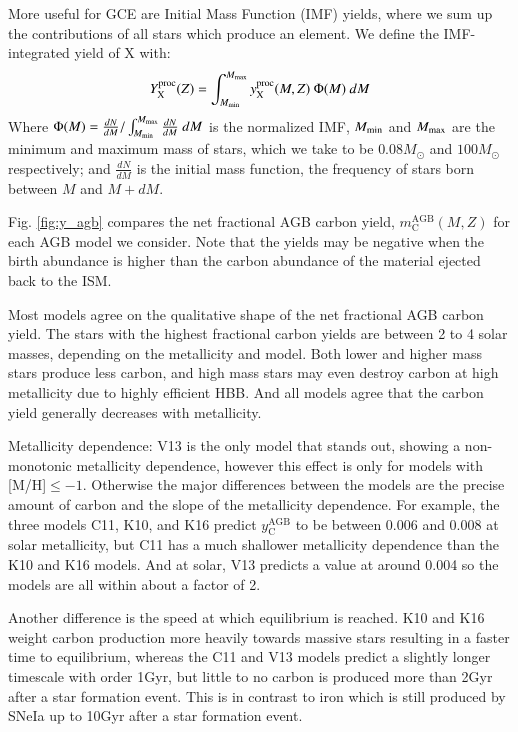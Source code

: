 \documentclass[12pt,oneside]{report}
\newcommand{\sun}{\ensuremath{\odot}}
\begin{document}
More useful for GCE are Initial Mass Function (IMF) yields, where we sum up the
contributions of all stars which produce an element.
We define the IMF-integrated yield of X with: 
\begin{equation}
Y_{\rm X}^{\rm proc}(Z) = \int_{M_{\rm min}}^{M_{\rm max}} y_{\rm X}^{\rm proc}(M, Z)\ \Phi(M)  \ dM
\end{equation}
Where $\Phi(M) = \frac{dN}{dM}/ \int_{M_{\rm min}}^{M_{\rm max}} \frac{dN}{dM}\ dM$ is the normalized IMF, $M_{\rm min}$ and $M_{\rm max}$ are the minimum and maximum mass of stars, which we take to be $0.08 M_{\sun}$ and $100 M_{\sun}$ respectively; and $\frac{dN}{dM}$ is the initial mass function, the frequency of stars born between $M$ and $M+dM$.


Fig. \ref{fig:y_agb} compares the net fractional AGB carbon yield, $m_\text{C}^\text{AGB}(M, Z)$ for each AGB model we consider. Note that the yields may be negative when the birth abundance is higher than the carbon abundance of the material ejected back to the ISM. 

Most models agree on the qualitative shape of the net fractional AGB carbon yield. The stars with the highest fractional carbon yields are between 2 to 4 solar masses, depending on the metallicity and model. Both lower and higher mass stars produce less carbon, and high mass stars may even destroy carbon at high metallicity due to highly efficient HBB. And all models agree that the carbon yield generally decreases with metallicity. 


Metallicity dependence:
V13 is the only model that stands out, showing a non-monotonic metallicity dependence, however this effect is only for models with [M/H]$\leq -1$. Otherwise the major differences between the models are the precise amount of carbon and the slope of the metallicity dependence. For example, the three models C11, K10, and K16 predict $y_\text{C}^\text{AGB}$ to be between 0.006 and 0.008 at solar metallicity, but C11 has a much shallower metallicity dependence than the K10 and K16 models. And at solar, V13 predicts a value at around 0.004 so the models are all within about a factor of 2. 

Another difference is the speed at which equilibrium is reached. K10 and K16 weight carbon production more heavily towards massive stars resulting in a faster time to equilibrium, whereas the C11 and V13 models predict a slightly longer timescale with order 1Gyr, but little to no carbon is produced more than 2Gyr after a star formation event. This is in contrast to iron which is still produced by SNeIa up to 10Gyr after a star formation event. 
\end{document}
